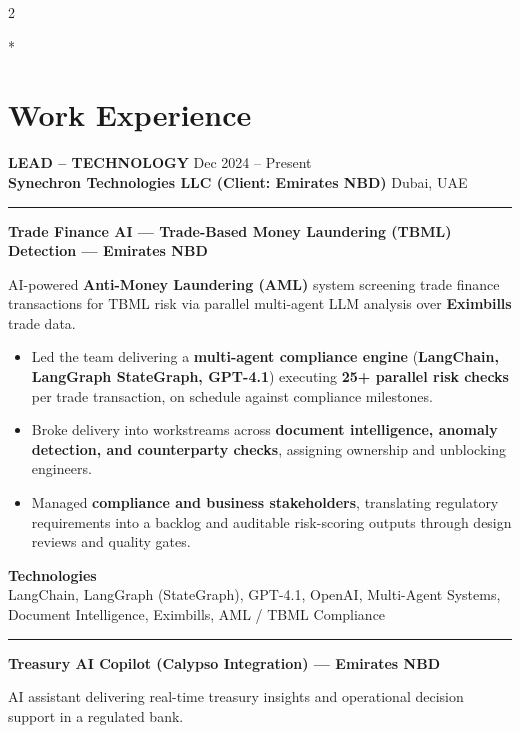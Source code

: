 \documentclass[10pt,a4paper]{article}
\newcommand{\blockdivider}{\vspace{0pt}\color{rulecolor}\rule{\linewidth}{0.5pt}\color{primary}\vspace{4pt}}
\newcommand{\roleheader}[4]{%
  \noindent
  \textbf{\MakeUppercase{#3}}%
  \hfill
  \textcolor{secondary}{#4}\\[0pt]

  \noindent
  \textbf{#1}%
  \hfill
  \textcolor{secondary}{#2}\\[0pt]
}
\newcommand{\roledivider}{%
  \vspace{-1pt}%
  {\color{rulecolor}\rule{\linewidth}{0.5pt}}%
  \vspace{2pt}%
}
\newcommand{\projecttitle}[1]{\textbf{#1}\par\vspace{2pt}}
\begin{document}
\begin{paracol}{2}

\switchcolumn[0]*
\section*{Work Experience}

\roleheader{Synechron Technologies LLC (Client: Emirates NBD)}{Dubai, UAE}{Lead -- Technology}{Dec 2024 -- Present}
\roledivider

\projecttitle{Trade Finance AI — Trade-Based Money Laundering (TBML) Detection — Emirates NBD}

AI-powered \textbf{Anti-Money Laundering (AML)} system screening trade finance transactions for TBML risk via parallel multi-agent LLM analysis over \textbf{Eximbills} trade data.

\begin{itemize}

\item Led the team delivering a \textbf{multi-agent compliance engine} (\textbf{LangChain, LangGraph StateGraph, GPT-4.1}) executing \textbf{25+ parallel risk checks} per trade transaction, on schedule against compliance milestones.

\item Broke delivery into workstreams across \textbf{document intelligence, anomaly detection, and counterparty checks}, assigning ownership and unblocking engineers.

\item Managed \textbf{compliance and business stakeholders}, translating regulatory requirements into a backlog and auditable risk-scoring outputs through design reviews and quality gates.

\end{itemize}

\textbf{Technologies}\\
LangChain, LangGraph (StateGraph), GPT-4.1, OpenAI, Multi-Agent Systems, Document Intelligence, Eximbills, AML / TBML Compliance

\blockdivider

\projecttitle{Treasury AI Copilot (Calypso Integration) — Emirates NBD}

AI assistant delivering real-time treasury insights and operational decision support in a regulated bank.


\end{paracol}
\end{document}
